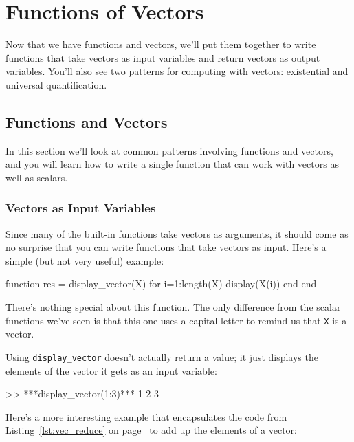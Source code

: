 \chapter{Functions of Vectors}

Now that we have functions and vectors, we'll put them together to write functions that take vectors as input variables and return vectors as output variables.  You'll also see two patterns for computing with vectors: existential and universal quantification.


\section{Functions and Vectors}

In this section we'll look at common patterns involving functions and vectors, and you will learn how to write a single function that can work with vectors as well as scalars.

\subsection{Vectors as Input Variables}

Since many of the built-in functions take vectors as arguments,
it should come as no surprise that you can write functions that
take vectors as input.  Here's a simple (but not very useful) example:


\begin{code}
function res = display_vector(X)
    for i=1:length(X)
        display(X(i))
    end
end
\end{code}

There's nothing special about this function.  The only
difference from the scalar functions we've seen is that this one uses
a capital letter to remind us that \lstinline{X} is a vector.

Using \lstinline{display_vector} doesn't actually return a value; it just displays the elements of the vector it gets as an input variable:

\begin{code}
>> ***display_vector(1:3)***
    1
    2
    3
\end{code}

Here's a more interesting example that encapsulates the code
from Listing~\ref{lst:vec_reduce} on page~\pageref{lst:vec_reduce} to add up the elements of a vector:

